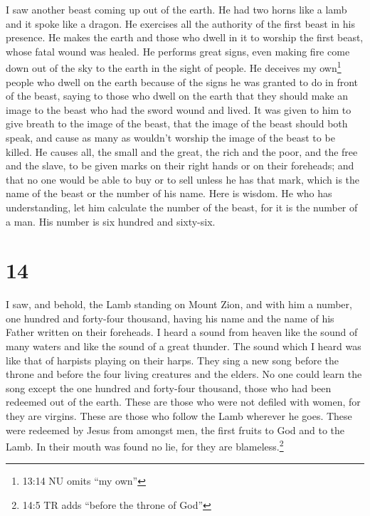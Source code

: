  I saw another beast coming up out of the earth. He had two
horns like a lamb and it spoke like a dragon.  He exercises
all the authority of the first beast in his presence. He makes the earth
and those who dwell in it to worship the first beast, whose fatal wound
was healed.  He performs great signs, even making fire come
down out of the sky to the earth in the sight of people. 
He deceives my own\footnote{13:14 NU omits ``my own''} people who dwell
on the earth because of the signs he was granted to do in front of the
beast, saying to those who dwell on the earth that they should make an
image to the beast who had the sword wound and lived.  It
was given to him to give breath to the image of the beast, that the
image of the beast should both speak, and cause as many as wouldn't
worship the image of the beast to be killed.  He causes
all, the small and the great, the rich and the poor, and the free and
the slave, to be given marks on their right hands or on their foreheads;
 and that no one would be able to buy or to sell unless he
has that mark, which is the name of the beast or the number of his name.
 Here is wisdom. He who has understanding, let him
calculate the number of the beast, for it is the number of a man. His
number is six hundred and sixty-six.

\hypertarget{section-13}{%
\section{14}\label{section-13}}

 I saw, and behold, the Lamb standing on Mount Zion, and
with him a number, one hundred and forty-four thousand, having his name
and the name of his Father written on their foreheads.  I
heard a sound from heaven like the sound of many waters and like the
sound of a great thunder. The sound which I heard was like that of
harpists playing on their harps.  They sing a new song
before the throne and before the four living creatures and the elders.
No one could learn the song except the one hundred and forty-four
thousand, those who had been redeemed out of the earth. 
These are those who were not defiled with women, for they are virgins.
These are those who follow the Lamb wherever he goes. These were
redeemed by Jesus from amongst men, the first fruits to God and to the
Lamb.  In their mouth was found no lie, for they are
blameless.\footnote{14:5 TR adds ``before the throne of God''}

